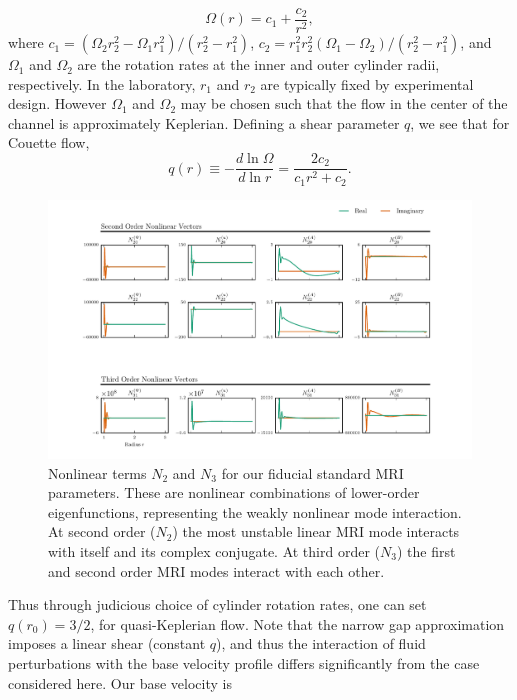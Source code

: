 \documentclass{emulateapj}
\begin{document}
\begin{equation}
  \label{eq:couette_flow}
  \Omega(r) = c_1 + \frac{c_2}{r^2},
\end{equation}
where $c_1 = (\Omega_2 r^2_2 - \Omega_1 r^2_1)/(r^2_2 - r^2_1)$, $c_2 = r^2_1 r^2_2 (\Omega_1 - \Omega_2)/(r^2_2 - r^2_1)$, and $\Omega_1$ and $\Omega_2$ are the rotation rates at the inner and outer cylinder radii, respectively. In the laboratory, $r_1$ and $r_2$ are typically fixed by experimental design. However $\Omega_1$ and $\Omega_2$ may be chosen such that the flow in the center of the channel is approximately Keplerian. Defining a shear parameter $q$, we see that for Couette flow,
\begin{equation}
  \label{eq:couette_q}
  q(r) \equiv -\frac{d \ln \Omega}{d \ln r} = \frac{2 c_2}{c_1 r^2 + c_2}.
\end{equation}

\begin{figure}
\centering
\includegraphics[width=\textwidth]{../figures/widegap_n2_n3_Pm16E-7.pdf}
\caption{Nonlinear terms $N_2$ and $N_3$ for our fiducial standard MRI parameters. These are nonlinear combinations of lower-order eigenfunctions, representing the weakly nonlinear mode interaction. At second order ($N_2$) the most unstable linear MRI mode interacts with itself and its complex conjugate. At third order ($N_3$) the first and second order MRI modes interact with each other.}\label{fig:N2_N3}
\end{figure}

Thus through judicious choice of cylinder rotation rates, one can set $q(r_0) = 3/2$, for quasi-Keplerian flow. Note that the narrow gap approximation imposes a linear shear (constant $q$), and thus the interaction of fluid perturbations with the base velocity profile differs significantly from the case considered here. Our base velocity is 
\end{document}
